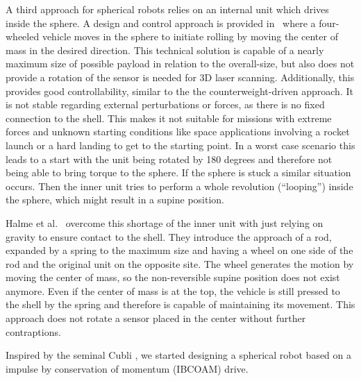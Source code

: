 A third approach for spherical robots relies on an internal unit which drives inside the sphere.
A design and control approach is provided in~\cite{soa6} where a four-wheeled vehicle moves in the sphere to initiate rolling by moving the center of mass in the desired direction.
This technical solution is capable of a nearly maximum size of possible payload in relation to the overall-size, but also does not provide a rotation of the sensor is needed for 3D laser scanning.
Additionally, this provides good controllability, similar to the the counterweight-driven approach.
It is not stable regarding external perturbations or forces, as there is no fixed connection to the shell.
This makes it not suitable for missions with extreme forces and unknown starting conditions like space applications involving a rocket launch or a hard landing to get to the starting point.
In a worst case scenario this leads to a start with the unit being rotated by 180 degrees and therefore not being able to bring torque to the sphere.
If the sphere is stuck a similar situation occurs.
Then the inner unit tries to perform a whole revolution (``looping'') inside the sphere, which might result in a supine position.

Halme et al.~\cite{soa7} overcome this shortage of the inner unit with just relying on gravity to ensure contact to the shell.
They introduce the approach of a rod, expanded by a spring to the maximum size and having a wheel on one side of the rod and the original unit on the opposite site.
The wheel generates the motion by moving the center of mass, so the non-reversible supine position does not exist anymore.
Even if the center of mass is at the top, the vehicle is still pressed to the shell by the spring and therefore is capable of maintaining its movement.
This approach does not rotate a sensor placed in the center without further contraptions.

Inspired by the seminal Cubli  \cite{cubliIROS12}, we started designing a spherical robot based on a impulse by conservation of momentum (IBCOAM) drive. 